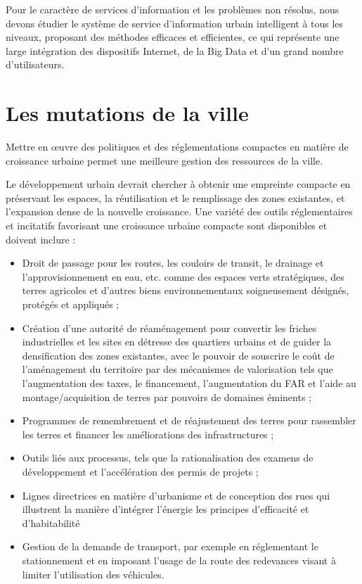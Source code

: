 Pour le caractère de services d'information et les problèmes non résolus,
nous devons étudier le système de service d'information urbain intelligent à tous les niveaux,
proposant des méthodes efficaces et efficientes, ce qui représente une large intégration des
dispositifs Internet, de la Big Data et d'un grand nombre d'utilisateurs.

\section{Les mutations de la ville}

Mettre en œuvre des politiques et des réglementations compactes en matière de croissance urbaine
permet une meilleure gestion des ressources de la ville.

Le développement urbain devrait chercher à obtenir une empreinte compacte en préservant les
espaces, la réutilisation et le remplissage des zones existantes, et l'expansion dense de la nouvelle croissance.
Une variété des outils réglementaires et incitatifs favorisant une croissance urbaine compacte sont disponibles
et doivent inclure :

\begin{itemize}
\item Droit de passage pour les routes, les couloirs de transit, le drainage et l'approvisionnement en eau, etc.
comme des espaces verts stratégiques, des terres agricoles et d'autres biens environnementaux soigneusement
désignés, protégés et appliqués ;
\item Création d'une autorité de réaménagement pour convertir les friches industrielles et les sites en détresse
des quartiers urbains et de guider la densification des zones existantes, avec le pouvoir de souscrire
le coût de l'aménagement du territoire par des mécanismes de valorisation tels que l'augmentation des taxes,
le financement, l'augmentation du FAR et l'aide au montage/acquisition de terres par
pouvoirs de domaines éminents ;
\item Programmes de remembrement et de réajustement des terres pour rassembler les terres et financer les
améliorations des infrastructures ;
\item Outils liés aux processus, tels que la rationalisation des examens de développement et l'accélération
des permis de projets ;
\item Lignes directrices en matière d'urbanisme et de conception des rues qui illustrent la manière d'intégrer l'énergie
les principes d'efficacité et d'habitabilité
\item Gestion de la demande de transport, par exemple en réglementant le stationnement et en imposant l'usage de la route
des redevances visant à limiter l'utilisation des véhicules.

\end{itemize}

